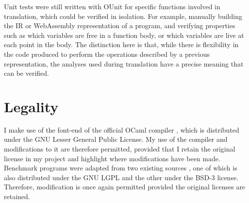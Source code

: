 Unit tests were still written with OUnit \cite{ounit} for specific functions involved in translation, which could be verified in isolation. For example, manually building the IR or WebAssembly representation of a program, and verifying properties such as which variables are free in a function body, or which variables are live at each point in the body. The distinction here is that, while there is flexibility in the code produced to perform the operations described by a previous representation, the analyses used during translation have a precise meaning that can be verified. 



\section{Legality}
I make use of the font-end of the official OCaml compiler \cite{ocaml}, which is distributed under the GNU Lesser General Public License. My use of the compiler and modifications to it are therefore permitted, provided that I retain the original license in my project and highlight where modifications have been made. Benchmark programs were adapted from two existing sources \cite{chris00, benchmark-game}, one of which is also distributed under the GNU LGPL and the other under the BSD-3 license. Therefore, modification is once again permitted provided the original licenses are retained.



